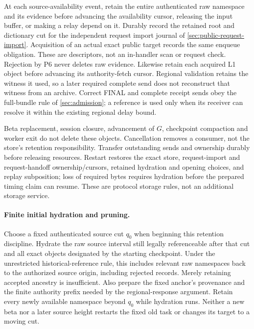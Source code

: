 At each source-availability event, retain the entire authenticated raw
namespace and its evidence before advancing the availability cursor,
releasing the input buffer, or making a relay depend on it. Durably
record the retained root and dictionary cut for the independent request
import journal of \cref{sec:public-request-import}. Acquisition of an
actual exact public target records the same enqueue obligation. These
are descriptors, not an in-handler scan or request check. Rejection
by P6 never deletes raw evidence. Likewise retain each acquired L1
object before advancing its authority-fetch cursor. Regional validation
retains the witness it used, so a later required complete send does not
reconstruct that witness from an archive. Correct FINAL and complete
receipt sends obey the full-bundle rule of \cref{sec:admission}; a
reference is used only when its receiver can resolve it within the
existing regional delay bound.

Beta replacement, session closure, advancement of $G$, checkpoint
compaction and worker exit do not delete these objects. Cancellation
removes a consumer, not the store's retention responsibility. Transfer
outstanding sends and ownership durably before releasing resources.
Restart restores the exact store, request-import and request-handoff
ownership/cursors, retained hydration and opening choices, and
replay subposition; loss of required
bytes requires hydration before the prepared timing claim can resume.
These are protocol storage rules, not an additional storage service.

\paragraph{Finite initial hydration and pruning.}
\label{sec:source-hydration}
Choose a fixed authenticated source cut $q_0$ when beginning this
retention discipline. Hydrate the raw source interval still legally
referenceable after that cut and all exact objects designated by the
starting checkpoint. Under the unrestricted historical-reference rule,
this includes relevant raw namespaces back to the authorized source
origin, including rejected records. Merely retaining accepted ancestry
is insufficient. Also prepare the fixed anchor's provenance and the
finite authority prefix needed by the regional-response argument.
Retain every newly available namespace beyond $q_0$ while hydration
runs. Neither a new beta nor a later source height restarts the fixed
old task or changes its target to a moving cut.

